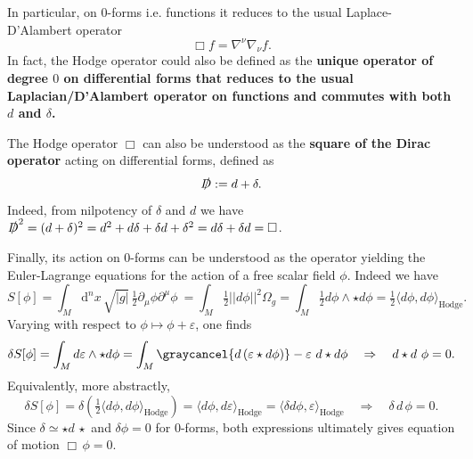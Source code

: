\begin{mytheorem}
In particular, on 0-forms i.e. functions it reduces to the usual Laplace-D'Alambert operator
\begin{equation}
    \Box f =  \nabla^{\nu} \nabla_{\nu} f.
\end{equation}
In fact, the Hodge operator could also  be defined as the \textbf{unique operator of degree $0$ on differential forms that reduces to the usual Laplacian/D'Alambert operator on functions and commutes with both \(d\) and \(\delta\).}
\medskip

The Hodge operator $\Box$ can also be understood as the \textbf{square of the Dirac operator} acting on differential forms, defined as
\begin{equation}
    \slashed{D} := d + \delta.
\end{equation}
Indeed, from nilpotency of $\delta$ and $d$ we have $\slashed{D}^2 = (d + \delta)^2 = d^2 + d \delta + \delta d + \delta^2 = d \delta + \delta d = \Box$.

Finally, its action on 0-forms can be understood as the operator yielding the Euler-Lagrange equations for the action of a free scalar field \(\phi\).
Indeed we have 
\begin{equation}
    S[\phi] =  \int_M\!\! \mathrm{d}^n x\, \sqrt{|g|}\,\tfrac{1}{2} \partial_\mu \phi \partial^\mu \phi\
    = \int_M \tfrac{1}{2}  ||d\phi||^2 \Omega_g = \int_M \tfrac{1}{2} d\phi \wedge \star d\phi 
    = \tfrac{1}{2}\langle d\phi, d\phi \rangle_{\mathrm{Hodge}}.
\end{equation}
Varying with respect to \(\phi\mapsto \phi +\varepsilon\), one finds
\begin{equation}
    \delta S[\phi] = \int_M d \varepsilon \wedge \star d\phi = \int_M \graycancel{d\left(\varepsilon \star d\phi\right)} - \varepsilon\,\, d \star d\phi \quad \Rightarrow \quad d \star d\,\,\phi  = 0.
\end{equation}
Equivalently, more abstractly,
\begin{equation}
    \delta S[\phi] = \delta \left(\tfrac{1}{2}\langle d\phi, d\phi \rangle_{\mathrm{Hodge}}\right)
    = \langle d \phi, d \varepsilon \rangle_{\mathrm{Hodge}}
    = \langle \delta d \phi, \varepsilon \rangle_{\mathrm{Hodge}} \quad \Rightarrow \quad \delta\, d\, \phi = 0.
\end{equation}
Since $\delta \simeq \star d\,\star$ and $\delta \phi=0$ for 0-forms, both expressions ultimately gives equation of motion  $\Box\, \phi = 0$.
%
\end{mytheorem}



